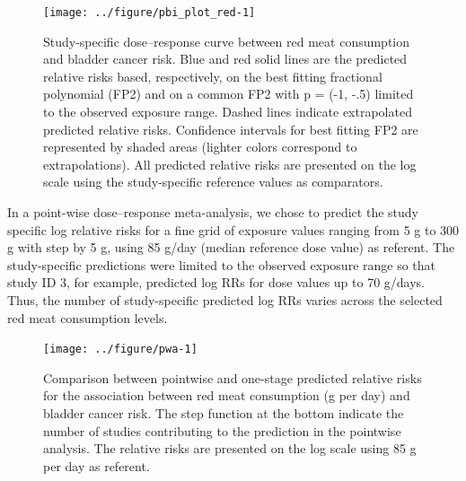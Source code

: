 \documentclass[11pt,a4paper,twoside,openany]{book}\usepackage{knitr}
\begin{document}
{{\begin{knitrout}\footnotesize
{}\color{fgcolor}\begin{figure}[h]

{\centering \texttt{[image: ../figure/pbi\_plot\_red-1]} 

}

\caption[Study-specific dose--response curve between red meat consumption and bladder cancer risk]{Study-specific dose--response curve between red meat consumption and bladder cancer risk. Blue and red solid lines are the predicted relative risks based, respectively, on the best fitting fractional polynomial (FP2) and on a common FP2 with p = (-1, -.5) limited to the observed exposure range. Dashed lines indicate extrapolated predicted relative risks. Confidence intervals for best fitting FP2 are represented by shaded areas (lighter colors correspond to extrapolations). All predicted relative risks are presented on the log scale using the study-specific reference values as comparators.}\label{fig:pbi_plot_red}
\end{figure}


\end{knitrout}

\clearpage

In a point-wise dose--response meta-analysis, we chose to predict the study specific log relative risks for a fine grid of exposure values ranging from 5 g to 300 g with step by 5 g, using 85 g/day (median reference dose value) as referent. The study-specific predictions were limited to the observed exposure range so that study ID 3, for example, predicted log RRs for dose values up to 70 g/days. Thus, the number of study-specific predicted log RRs varies across the selected red meat consumption levels. 

\begin{knitrout}\footnotesize
{}\color{fgcolor}\begin{figure}[h]

{\centering \texttt{[image: ../figure/pwa-1]} 

}

\caption[Comparison between pointwise and one-stage predicted relative risks for the association between red meat consumption (g per day) and bladder cancer risk]{Comparison between pointwise and one-stage predicted relative risks for the association between red meat consumption (g per day) and bladder cancer risk. The step function at the bottom indicate the number of studies contributing to the prediction in the pointwise analysis. The relative risks are presented on the log scale using 85 g per day as referent.}\label{fig:pwa}
\end{figure}



\end{knitrout}}}
\end{document}
